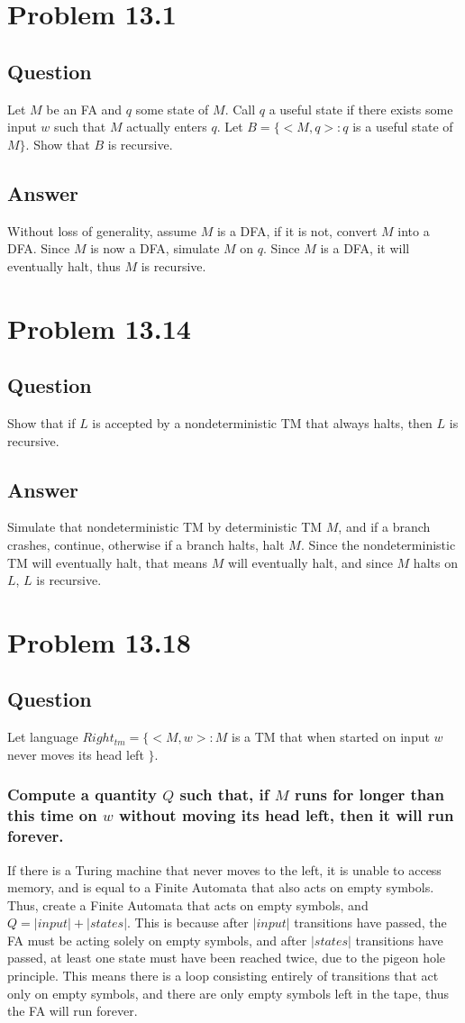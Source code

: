\documentclass[12pt, a4paper]{article}
\begin{document}
\section{Problem 13.1}
\subsection{Question}
Let $M$ be an FA and $q$ some state of $M$. Call $q$ a useful state if there exists some input $w$ such that $M$ actually enters $q$. Let $B = \{<M,q>:q$ is a useful state of $M \}$. Show that $B$ is recursive.
\subsection{Answer}
Without loss of generality, assume $M$ is a DFA, if it is not, convert $M$ into a DFA. Since $M$ is now a DFA, simulate $M$ on $q$. Since $M$ is a DFA, it will eventually halt, thus $M$ is recursive.

\section{Problem 13.14}
\subsection{Question}
Show that if $L$ is accepted by a nondeterministic TM that always halts, then $L$ is recursive.
\subsection{Answer}
Simulate that nondeterministic TM by deterministic TM $M$, and if a branch crashes, continue, otherwise if a branch halts, halt $M$. Since the nondeterministic TM will eventually halt, that means $M$ will eventually halt, and since $M$ halts on $L$, $L$ is recursive.

\section{Problem 13.18}
\subsection{Question}
Let language $Right_{tm} = \{<M,w>: M$ is a TM that when started on input $w$ never moves its head left $\}$.
\subsubsection{Compute a quantity $Q$ such that, if $M$ runs for longer than this time on $w$ without moving its head left, then it will run forever.}
If there is a Turing machine that never moves to the left, it is unable to access memory, and is equal to a Finite Automata that also acts on empty symbols. Thus, create a Finite Automata that acts on empty symbols, and $Q = |input| + |states|$. This is because after $|input|$ transitions have passed, the FA must be acting solely on empty symbols, and after $|states|$ transitions have passed, at least one state must have been reached twice, due to the pigeon hole principle. This means there is a loop consisting entirely of transitions that act only on empty symbols, and there are only empty symbols left in the tape, thus the FA will run forever.
\end{document}
